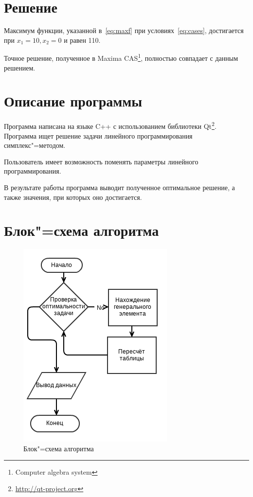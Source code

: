 \documentclass[a4paper,12pt,notitlepage,headsepline,pdftex]{scrartcl}
\begin{document}
\section{Решение}
  Максимум функции, указанной в~\eqref{eq:maxf} при условиях~\eqref{eq:cases},
  достигается при $x_1 = 10, x_2 = 0$  и равен 110.

  Точное решение, полученное в Maxima CAS\footnote{Computer algebra system},
  полностью совпадает с данным решением.

\section{Описание программы}
  Программа написана на языке C++ с использованием библиотеки
  Qt\footnote{\url{http://qt-project.org}}.
  Программа ищет решение задачи линейного программирования симплекс"=методом.

  Пользователь имеет возможность поменять параметры линейного
  программирования.

  В результате работы программа выводит полученное оптимальное решение, а
  также значения, при которых оно достигается.
  \newpage
\section{Блок"=схема алгоритма}
  \begin{figure}[h!]
    \begin{center}
      \includegraphics[scale=0.60]{flowchart.png}
    \end{center}
    \caption{Блок"=схема алгоритма}
    \label{fig:flowchart}
  \end{figure}
  \newpage
\end{document}
